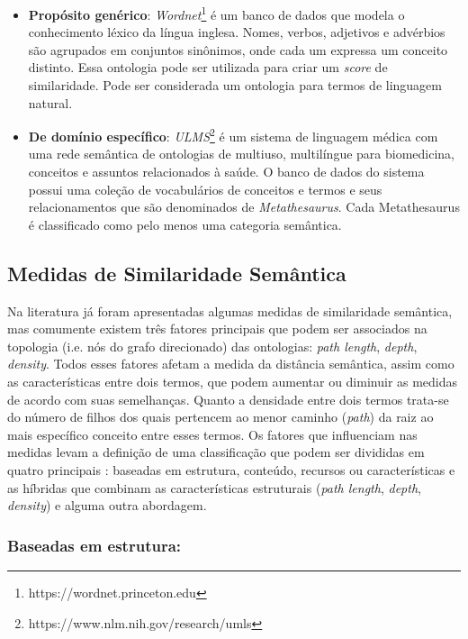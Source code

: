 \begin{itemize}
	\item{\textbf{Propósito genérico}: \textit{Wordnet}\footnote{https://wordnet.princeton.edu} é um banco de dados que modela o conhecimento léxico da língua inglesa. Nomes, verbos, adjetivos e advérbios são agrupados em conjuntos sinônimos, onde cada um expressa um conceito distinto. Essa ontologia pode ser utilizada para criar um \textit{score} de similaridade. Pode ser considerada um ontologia para termos de linguagem natural.}
	
	\item{\textbf{De domínio específico}: \textit{ULMS}\footnote{https://www.nlm.nih.gov/research/umls} é um sistema de linguagem médica com uma rede semântica de ontologias de multiuso, multilíngue para biomedicina, conceitos e assuntos relacionados à saúde. O banco de dados do sistema possui uma coleção de vocabulários de conceitos e termos e seus relacionamentos que são denominados de \textit{Metathesaurus}. Cada Metathesaurus é classificado como pelo menos uma categoria semântica.}	
\end{itemize}

\subsection{Medidas de Similaridade Semântica}

Na literatura já foram apresentadas algumas medidas de similaridade semântica, mas comumente existem três fatores principais \citep{Slimani2013} que podem ser associados na topologia (i.e. nós do grafo direcionado) das ontologias: \textit{path length}, \textit{depth}, \textit{density}. Todos esses fatores afetam a medida da distância semântica, assim como as características entre dois termos, que podem aumentar ou diminuir as medidas de acordo com suas semelhanças. Quanto a densidade entre dois termos trata-se do número de filhos dos quais pertencem ao menor caminho (\textit{path}) da raiz ao mais específico conceito entre esses termos. Os fatores que influenciam nas medidas levam a definição de uma classificação que podem ser divididas em quatro principais \citep{Slimani2013}: baseadas em estrutura, conteúdo, recursos ou características e as híbridas que combinam as características estruturais (\textit{path length}, \textit{depth}, \textit{density}) e alguma outra abordagem.

\subsubsection{Baseadas em estrutura:}

